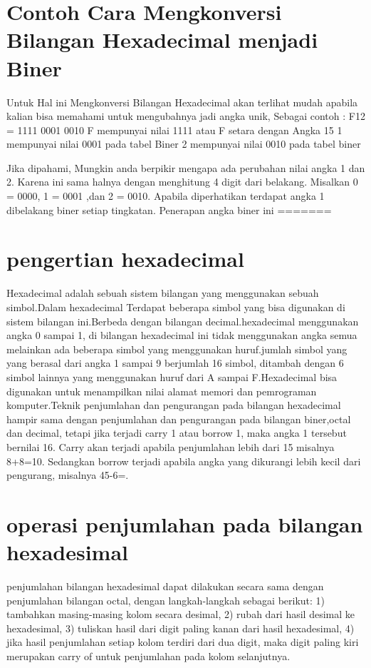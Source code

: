 \section{Contoh Cara Mengkonversi Bilangan Hexadecimal menjadi Biner}
 Untuk Hal ini Mengkonversi Bilangan Hexadecimal akan terlihat mudah apabila kalian bisa memahami untuk mengubahnya jadi angka unik, Sebagai contoh :
 F12 = 1111 0001 0010
 F mempunyai nilai 1111 atau F setara dengan Angka 15
 1 mempunyai nilai 0001 pada tabel Biner
 2 mempunyai nilai 0010 pada tabel biner
 
 Jika dipahami, Mungkin anda berpikir mengapa ada perubahan nilai angka 1 dan 2. Karena ini sama halnya dengan menghitung 4 digit dari belakang.
 Misalkan 0 = 0000, 1 = 0001 ,dan 2 = 0010. Apabila diperhatikan terdapat angka 1 dibelakang biner setiap tingkatan. Penerapan angka biner ini
=======
\section{pengertian hexadecimal}
	Hexadecimal adalah sebuah sistem bilangan yang menggunakan sebuah simbol.Dalam hexadecimal Terdapat beberapa simbol yang bisa digunakan di sistem bilangan ini.Berbeda dengan bilangan decimal.hexadecimal menggunakan angka 0 sampai 1, di bilangan hexadecimal ini tidak menggunakan angka semua melainkan ada beberapa simbol yang menggunakan huruf.jumlah simbol yang yang berasal dari angka 1 sampai 9 berjumlah 16 simbol, ditambah dengan 6 simbol lainnya yang menggunakan huruf dari A sampai F.Hexadecimal bisa digunakan untuk menampilkan nilai alamat memori dan pemrograman komputer.Teknik penjumlahan dan pengurangan pada bilangan hexadecimal hampir sama dengan penjumlahan dan pengurangan pada bilangan biner,octal dan decimal, tetapi jika terjadi carry 1 atau borrow 1, maka angka 1 tersebut bernilai 16. Carry akan terjadi apabila penjumlahan lebih dari 15 misalnya 8+8=10. Sedangkan borrow terjadi apabila angka yang dikurangi lebih kecil dari pengurang, misalnya 45-6=.
\section{operasi penjumlahan pada bilangan hexadesimal}
penjumlahan bilangan hexadesimal dapat dilakukan secara sama dengan penjumlahan bilangan octal, dengan langkah-langkah sebagai berikut: 1) tambahkan masing-masing kolom secara desimal, 2) rubah dari hasil desimal ke hexadesimal, 3) tuliskan hasil dari digit paling kanan dari hasil hexadesimal, 4) jika hasil penjumlahan setiap kolom terdiri dari dua digit, maka digit paling kiri merupakan carry of untuk penjumlahan pada kolom selanjutnya.
